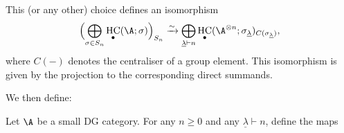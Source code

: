 \documentclass[12pt,a4paper,reqno]{amsart}
\DeclareMathOperator{\hochcx}{{HC}}
\begin{document}
This (or any other) choice defines an isomorphism 
\begin{equation}
\label{eqn-choice-of-conjugacy-class-representative-iso}
\Bigl(
\bigoplus_{ \sigma \in S_n}
\hochcx_{\bullet}(\A; \sigma)
\Bigr)_{S_n}
\xrightarrow{\sim}
\bigoplus_{\underline{\lambda} \vdash n}
\hochcx_{\bullet}(\A^{\otimes
n};\sigma_{\underline{\lambda}})_{C(\sigma_{\underline{\lambda}})},
\end{equation}
where $C(-)$ denotes the centraliser of a group element. This
isomorphism is given by the projection to the corresponding direct
summands. 

We then define:

\begin{defn}
\label{defn-maps-f-underline-n-and-g-underline-n}
Let $\A$ be a small DG category. For any $n \geq 0$ and 
any $\underline{\lambda} \vdash n$, define the maps
\begin{small}
 

\end{small}
\end{defn}
\end{document}
